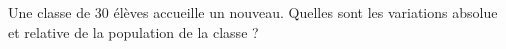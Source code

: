 
\begin{exercice}\label{exosmath-0098}

    Une classe de \( 30\) élèves accueille un nouveau. Quelles sont les variations absolue et relative de la population de la classe ?

\end{exercice}
